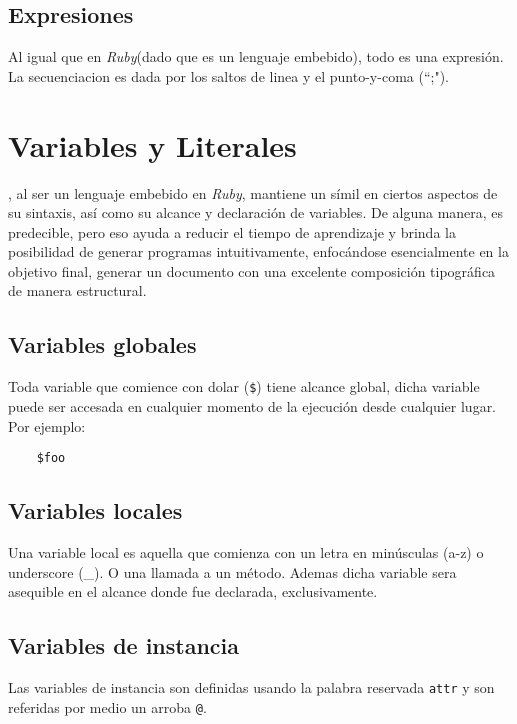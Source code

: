\documentclass[12pt,letterpaper,titlepage,oneside,openright]{book}
\newcommand{\OhTeX}{%
    \makebox[0.76em][c]{O}%
    \makebox[0.25em][c]{%
        \raisebox{0.14em}[0em][0em]{%
            \fontsize{0.5em}{0cm}%
                \selectfont H%
        }%
    }%
    \makebox[1.35em][c]{\TeX}%
}
\newcommand{\ohtex}{\OhTeX\xspace}
\newcommand{\ruby}{\textit{Ruby}\xspace}
\newcommand{\ttcode}[1]{(\texttt{#1})}
\begin{document}
\subsection{Expresiones}

Al igual que en \ruby (dado que es un lenguaje embebido), todo es una expresión.
La secuenciacion es dada por los saltos de linea y el punto-y-coma (``;").

\section{Variables y Literales}

\ohtex, al ser un lenguaje embebido en \ruby, mantiene un símil en ciertos
aspectos de su sintaxis, así como su alcance y declaración de variables. De
alguna manera, es predecible, pero eso ayuda a reducir el tiempo de aprendizaje
y brinda la posibilidad de generar programas intuitivamente, enfocándose
esencialmente en la objetivo final, generar un documento con una excelente
composición tipográfica de manera estructural.

\subsection{Variables globales}

Toda variable que comience con dolar \ttcode{\$} tiene alcance global, dicha
variable puede ser accesada en cualquier momento de la ejecución desde cualquier
lugar. Por ejemplo:

\begin{center}
\begin{lstlisting}
    $foo
\end{lstlisting}
\end{center}

\subsection{Variables locales}

Una variable local es aquella que comienza con un letra en minúsculas (a-z) o
underscore (\_). O una llamada a un método. Ademas dicha variable sera asequible
en el alcance donde fue declarada, exclusivamente.

\subsection{Variables de instancia}

Las variables de instancia son definidas usando la palabra reservada \texttt{attr} y son referidas por medio un arroba \texttt{@}.
\end{document}
